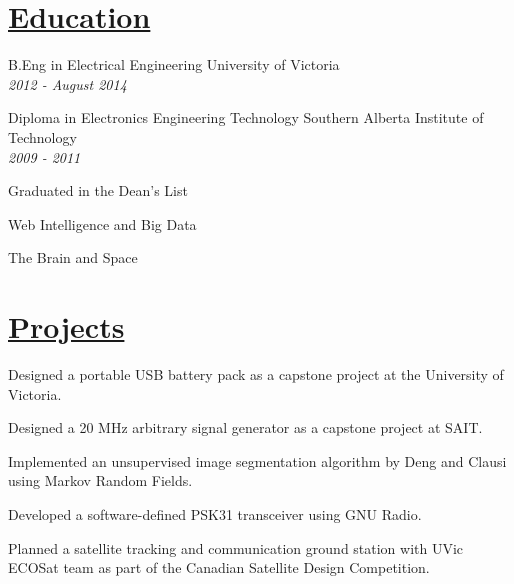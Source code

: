 \documentclass[a4paper, 11pt]{article}
\begin{document}
\section{\underline{Education}}
  \begin{description}[leftmargin=0pt]
    \begin{samepage}
      \item[B.Eng in Electrical Engineering] \hfill University of Victoria\\
      \emph{2012 -  August 2014}
    \end{samepage}
    \begin{samepage}
    \item[Diploma in Electronics Engineering Technology] \hfill Southern Alberta Institute of Technology\\
    \emph{2009 - 2011}
    \begin{itemize*}
      \item Graduated in the Dean's List
    \end{itemize*}
    \end{samepage}
    \item[Massive Open Online Courses] \hfill
      \begin{itemize*}
        \item Web Intelligence and Big Data
        \item The Brain and Space
      \end{itemize*}
  \end{description}
  
\section{\underline{Projects}}
  \begin{itemize*}
        \item Designed a portable USB battery pack as a capstone project at the University of Victoria.
        \item Designed a 20 MHz arbitrary signal generator as a capstone project at SAIT.
        \item Implemented an unsupervised image segmentation algorithm by Deng and Clausi using Markov Random Fields.
        \item Developed a software-defined PSK31 transceiver using GNU Radio. 
        \item Planned a satellite tracking and communication ground station with UVic ECOSat team as part of the Canadian Satellite Design Competition.
  \end{itemize*}
  
\end{document}
